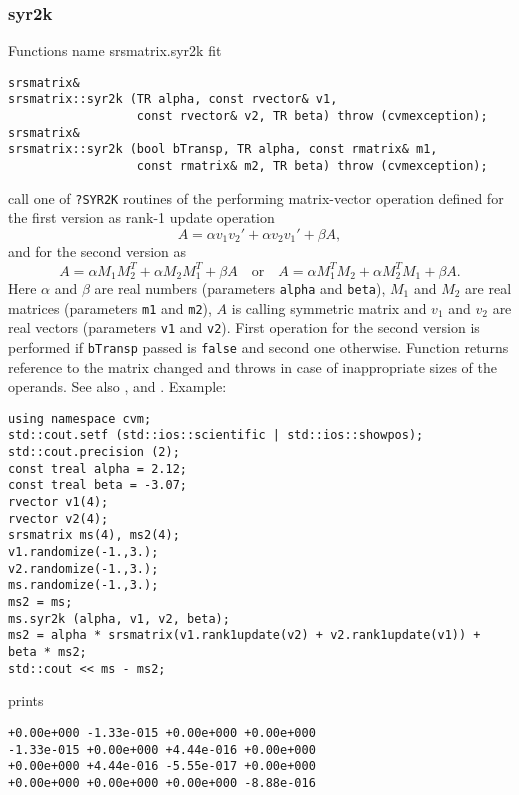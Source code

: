 \subsubsection{syr2k}
Functions%
\pdfdest name {srsmatrix.syr2k} fit
\begin{verbatim}
srsmatrix& 
srsmatrix::syr2k (TR alpha, const rvector& v1, 
                  const rvector& v2, TR beta) throw (cvmexception);
srsmatrix& 
srsmatrix::syr2k (bool bTransp, TR alpha, const rmatrix& m1, 
                  const rmatrix& m2, TR beta) throw (cvmexception);
\end{verbatim}
call one of \verb"?SYR2K" routines of the
performing  matrix-vector operation defined for the first version as
rank-1 update operation
\begin{equation*}
A=\alpha v_1 v_2' + \alpha v_2 v_1' + \beta A,
\end{equation*}
and for the second version as
\begin{equation*}
A=\alpha M_1 M_2^T + \alpha M_2 M_1^T + \beta A\quad
\text{or}\quad 
A=\alpha M_1^T M_2 + \alpha M_2^T M_1 + \beta A.
\end{equation*}
Here $\alpha$ and $\beta$ are real numbers 
(parameters \verb"alpha" and \verb"beta"),
$M_1$ and $M_2$ are real matrices (parameters \verb"m1" and \verb"m2"),
$A$ is  calling symmetric matrix
and $v_1$ and $v_2$ are real vectors (parameters \verb"v1" and \verb"v2").
First operation for the second version 
is performed if \verb"bTransp" passed
is \verb"false" and second one otherwise.
Function
returns  reference to the matrix changed and throws
in case of inappropriate sizes of the operands.
See also
,
 and .
Example:
\begin{Verbatim}
using namespace cvm;
std::cout.setf (std::ios::scientific | std::ios::showpos); 
std::cout.precision (2);
const treal alpha = 2.12;
const treal beta = -3.07;
rvector v1(4);
rvector v2(4);
srsmatrix ms(4), ms2(4);
v1.randomize(-1.,3.);
v2.randomize(-1.,3.);
ms.randomize(-1.,3.);
ms2 = ms;
ms.syr2k (alpha, v1, v2, beta);
ms2 = alpha * srsmatrix(v1.rank1update(v2) + v2.rank1update(v1)) + beta * ms2;
std::cout << ms - ms2;
\end{Verbatim}
prints
\begin{Verbatim}
+0.00e+000 -1.33e-015 +0.00e+000 +0.00e+000
-1.33e-015 +0.00e+000 +4.44e-016 +0.00e+000
+0.00e+000 +4.44e-016 -5.55e-017 +0.00e+000
+0.00e+000 +0.00e+000 +0.00e+000 -8.88e-016
\end{Verbatim}

